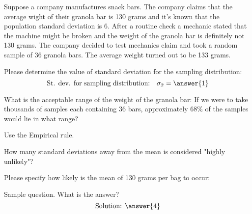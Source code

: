 \documentclass{ximera}
\begin{document}
\begin{example}
Suppose a company manufactures snack bars. The company claims that the average wight of their granola bar is 130 grams and it's known that the population standard deviation is 6. After a routine check a mechanic stated that the machine might be broken and the weight of the granola bar is definitely not 130 grams. The company decided to test mechanics claim and took a random sample of 36 granola bars. The average weight turned out to be 133 grams.

\begin{question}
Please determine the value of standard deviation for the sampling distribution:
$$\mbox{St. dev. for sampling distribution:}\quad\sigma_{\bar{x}}= \answer{1}$$
\end{question}

\begin{question}
What is the acceptable range of the weight of the granola bar:
If we were to take thousands of samples each containing 36 bars, approximately $68\%$ of the samples would lie in what range?

\begin{hint}
Use the Empirical rule.
\end{hint}
\begin{multipleChoice}
\end{multipleChoice}
\end{question}

\begin{question}
How many standard deviations away from the mean is considered "highly unlikely"?
\begin{multipleChoice}
\end{multipleChoice}
\end{question}

\begin{question}
Please specify how likely is the mean of 130 grams per bag to occur:
\begin{multipleChoice}
\end{multipleChoice}
\end{question}

Sample question.  What is the answer?
$$\text{Solution: }\answer{4}$$

\end{example}
\end{document}
